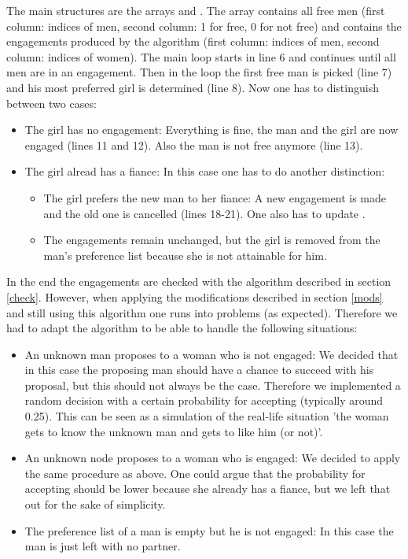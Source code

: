 \documentclass[11pt]{article}
\begin{document}
The main structures are the arrays  and . The array  contains all free men (first column: indices of
men, second column: 1 for free, 0 for not free) and  contains the engagements produced by the algorithm (first column: indices of men, 
second column: indices of women). The main loop starts in line 6 and continues until all men are in an engagement. Then in the loop
the first free man is picked (line 7) and his most preferred girl is determined (line 8). Now one has to distinguish between two cases:

\begin{itemize}
  \item The girl has no engagement: Everything is fine, the man and the girl are now engaged (lines 11 and 12). Also the man is not free
  anymore (line 13).
  \item The girl alread has a fiance: In this case one has to do another distinction:
  \begin{itemize}
    \item The girl prefers the new man to her fiance: A new engagement is made and the old one is cancelled (lines 18-21).
    One also has to update .
    \item The engagements remain unchanged, but the girl is removed from the man's preference list because she is not attainable for him.
  \end{itemize}
\end{itemize}

In the end the engagements are checked with the  algorithm described in section \ref{check}. However, when applying the
modifications described in section \ref{mods} and still using this algorithm one runs into problems (as expected). Therefore we had to adapt
the  algorithm to be able to handle the following situations:

\begin{itemize}
  \item An unknown man proposes to a woman who is not engaged: We decided that in this case the proposing man should have a chance to succeed
  with his proposal, but this should not always be the case. Therefore we implemented a random decision with a certain probability for accepting
  (typically around 0.25). This can be seen as a simulation of the real-life situation 'the woman gets to know the unknown man
  and gets to like him (or not)'.
  \item An unknown node proposes to a woman who is engaged: We decided to apply the same procedure as above. One could argue that the probability
  for accepting should be lower because she already has a fiance, but we left that out for the sake of simplicity.
  \item The preference list of a man is empty but he is not engaged: In this case the man is just left with no partner.
\end{itemize}
\end{document}
